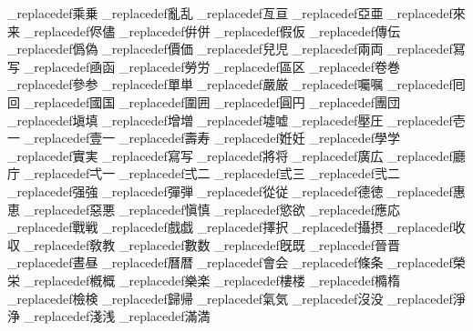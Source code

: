 \brl@document_replacedef{乘}{乗}
\brl@document_replacedef{亂}{乱}
\brl@document_replacedef{亙}{亘}
\brl@document_replacedef{亞}{亜}
\brl@document_replacedef{來}{来}
\brl@document_replacedef{侭}{儘}
\brl@document_replacedef{倂}{併}
\brl@document_replacedef{假}{仮}
\brl@document_replacedef{傳}{伝}
\brl@document_replacedef{僞}{偽}
\brl@document_replacedef{價}{価}
\brl@document_replacedef{兒}{児}
\brl@document_replacedef{兩}{両}
\brl@document_replacedef{冩}{写}
\brl@document_replacedef{凾}{函}
\brl@document_replacedef{勞}{労}
\brl@document_replacedef{區}{区}
\brl@document_replacedef{卷}{巻}
\brl@document_replacedef{參}{参}
\brl@document_replacedef{單}{単}
\brl@document_replacedef{嚴}{厳}
\brl@document_replacedef{囑}{嘱}
\brl@document_replacedef{囘}{回}
\brl@document_replacedef{國}{国}
\brl@document_replacedef{圍}{囲}
\brl@document_replacedef{圓}{円}
\brl@document_replacedef{團}{団}
\brl@document_replacedef{塡}{填}
\brl@document_replacedef{增}{増}
\brl@document_replacedef{墟}{嘘}
\brl@document_replacedef{壓}{圧}
\brl@document_replacedef{壱}{一}
\brl@document_replacedef{壹}{一}
\brl@document_replacedef{壽}{寿}
\brl@document_replacedef{姙}{妊}
\brl@document_replacedef{學}{学}
\brl@document_replacedef{實}{実}
\brl@document_replacedef{寫}{写}
\brl@document_replacedef{將}{将}
\brl@document_replacedef{廣}{広}
\brl@document_replacedef{廳}{庁}
\brl@document_replacedef{弌}{一}
\brl@document_replacedef{弍}{二}
\brl@document_replacedef{弎}{三}
\brl@document_replacedef{弐}{二}
\brl@document_replacedef{强}{強}
\brl@document_replacedef{彈}{弾}
\brl@document_replacedef{從}{従}
\brl@document_replacedef{德}{徳}
\brl@document_replacedef{惠}{恵}
\brl@document_replacedef{惡}{悪}
\brl@document_replacedef{愼}{慎}
\brl@document_replacedef{慾}{欲}
\brl@document_replacedef{應}{応}
\brl@document_replacedef{戰}{戦}
\brl@document_replacedef{戲}{戯}
\brl@document_replacedef{擇}{択}
\brl@document_replacedef{攝}{摂}
\brl@document_replacedef{收}{収}
\brl@document_replacedef{敎}{教}
\brl@document_replacedef{數}{数}
\brl@document_replacedef{旣}{既}
\brl@document_replacedef{晉}{晋}
\brl@document_replacedef{晝}{昼}
\brl@document_replacedef{曆}{暦}
\brl@document_replacedef{會}{会}
\brl@document_replacedef{條}{条}
\brl@document_replacedef{榮}{栄}
\brl@document_replacedef{槪}{概}
\brl@document_replacedef{樂}{楽}
\brl@document_replacedef{樓}{楼}
\brl@document_replacedef{橢}{楕}
\brl@document_replacedef{檢}{検}
\brl@document_replacedef{歸}{帰}
\brl@document_replacedef{氣}{気}
\brl@document_replacedef{沒}{没}
\brl@document_replacedef{淨}{浄}
\brl@document_replacedef{淺}{浅}
\brl@document_replacedef{滿}{満}
